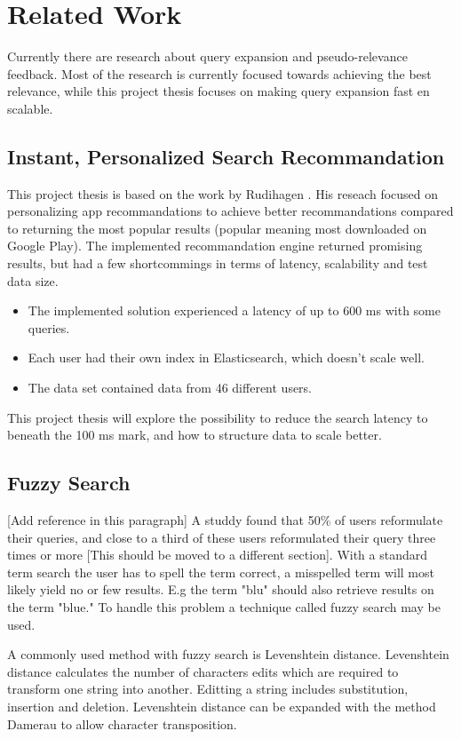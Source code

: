 \chapter{Related Work}
\label{ch:related-work}
Currently there are research about query expansion and pseudo-relevance feedback.
Most of the research is currently focused towards achieving the best relevance,
while this project thesis focuses on making query expansion fast en scalable.

\section{Instant, Personalized Search Recommandation}
This project thesis is based on the work by Rudihagen \cite{master-thesis}.
His reseach focused on personalizing app recommandations to achieve better recommandations compared to returning the most popular results (popular meaning most downloaded on Google Play).
The implemented recommandation engine returned promising results, but had a few shortcommings in terms of latency, scalability and test data size.

\begin{itemize}
  \item The implemented solution experienced a latency of up to 600 ms with some queries.
  \item Each user had their own index in Elasticsearch, which doesn't scale well.
  \item The data set contained data from 46 different users.
\end{itemize}

This project thesis will explore the possibility to reduce the search latency to beneath the 100 ms mark, and how to structure data to scale better.

\section{Fuzzy Search}
[Add reference in this paragraph]
A studdy found that 50\% of users reformulate their queries, and close to a third of these users reformulated their query three times or more \cite{query-reformulate}[This should be moved to a different section].
With a standard term search the user has to spell the term correct, a misspelled term will most likely yield no or few results.
E.g the term "blu" should also retrieve results on the term "blue."
To handle this problem a technique called fuzzy search may be used.

A commonly used method with fuzzy search is Levenshtein distance.
Levenshtein distance calculates the number of characters edits which are required to transform one string into another.
Editting a string includes substitution, insertion and deletion.
Levenshtein distance can be expanded with the method Damerau to allow character transposition.

